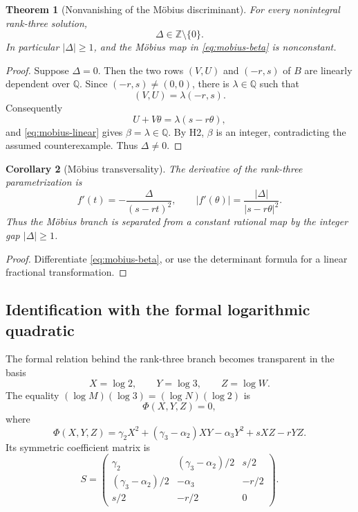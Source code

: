 \documentclass[11pt,oneside]{article}
\theoremstyle{research}
\newtheorem{theorem}{Theorem}[section]
\newtheorem{corollary}[theorem]{Corollary}
\theoremstyle{definition}
\newcommand{\Q}{\mathbb Q}
\newcommand{\Z}{\mathbb Z}
\begin{document}
\begin{theorem}[Nonvanishing of the M\"obius discriminant]
\label{thm:Delta-nonzero}
For every nonintegral rank-three solution,
\begin{equation}
 \boxed{\Delta\in\Z\setminus\{0\}.}
 \label{eq:Delta-nonzero}
\end{equation}
In particular $|\Delta|\ge1$, and the M\"obius map in
\eqref{eq:mobius-beta} is nonconstant.
\end{theorem}

\begin{proof}
Suppose $\Delta=0$.  Then the two rows $(V,U)$ and $(-r,s)$ of $B$ are
linearly dependent over $\Q$.  Since $(-r,s)\ne(0,0)$, there is
$\lambda\in\Q$ such that
\[
 (V,U)=\lambda(-r,s).
\]
Consequently
\[
 U+V\theta=\lambda(s-r\theta),
\]
and \eqref{eq:mobius-linear} gives $\beta=\lambda\in\Q$.  By H2, $\beta$ is
an integer, contradicting the assumed counterexample.  Thus $\Delta\ne0$.
\end{proof}

\begin{corollary}[M\"obius transversality]
\label{cor:mobius-derivative}
The derivative of the rank-three parametrization is
\begin{equation}
 f'(t)=-\frac{\Delta}{(s-rt)^2},
 \qquad
 |f'(\theta)|=\frac{|\Delta|}{|s-r\theta|^2}.
 \label{eq:mobius-derivative}
\end{equation}
Thus the M\"obius branch is separated from a constant rational map by the
integer gap $|\Delta|\ge1$.
\end{corollary}

\begin{proof}
Differentiate \eqref{eq:mobius-beta}, or use the determinant formula for a
linear fractional transformation.
\end{proof}

\subsection{Identification with the formal logarithmic quadratic}

The formal relation behind the rank-three branch becomes transparent in the
basis
\[
 X=\log2,
 \qquad Y=\log3,
 \qquad Z=\log W.
\]
The equality $(\log M)(\log3)=(\log N)(\log2)$ is
\begin{equation}
 \Phi(X,Y,Z)=0,
 \label{eq:Phi-zero}
\end{equation}
where
\begin{equation}
 \Phi(X,Y,Z)
 =\gamma_2X^2+(\gamma_3-\alpha_2)XY-\alpha_3Y^2
   +sXZ-rYZ.
 \label{eq:formal-q}
\end{equation}
Its symmetric coefficient matrix is
\begin{equation}
 S=\begin{pmatrix}
 \gamma_2 &(\gamma_3-\alpha_2)/2&s/2\\
 (\gamma_3-\alpha_2)/2&-\alpha_3&-r/2\\
 s/2&-r/2&0
 \end{pmatrix}.
 \label{eq:quadratic-matrix}
\end{equation}
\end{document}
